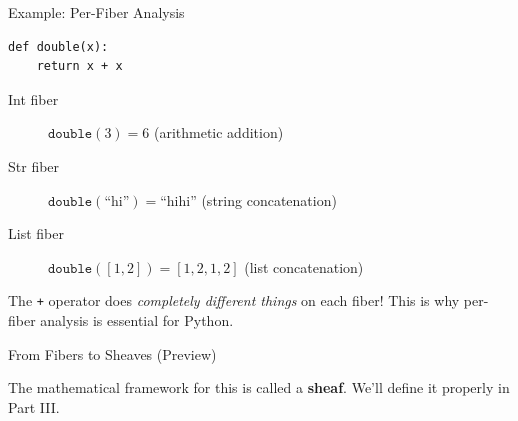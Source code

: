 \documentclass[aspectratio=169,11pt]{beamer}
\begin{document}
\begin{frame}[fragile]{Example: Per-Fiber Analysis}
\begin{lstlisting}[language=deppy]
def double(x):
    return x + x
\end{lstlisting}

\vspace{0.5em}
\begin{description}
\item[Int fiber] $\mathtt{double}(3) = 6$ \quad (arithmetic addition)
\item[Str fiber] $\mathtt{double}(\text{``hi''}) = \text{``hihi''}$ \quad (string concatenation)
\item[List fiber] $\mathtt{double}([1,2]) = [1,2,1,2]$ \quad (list concatenation)
\end{description}

\vspace{0.5em}
The \texttt{+} operator does \emph{completely different things} on each fiber!
This is why per-fiber analysis is essential for Python.
\end{frame}

\begin{frame}{From Fibers to Sheaves (Preview)}
\begin{center}
\end{center}

The mathematical framework for this is called a \textbf{sheaf}.
We'll define it properly in Part III.
\end{frame}
\end{document}
